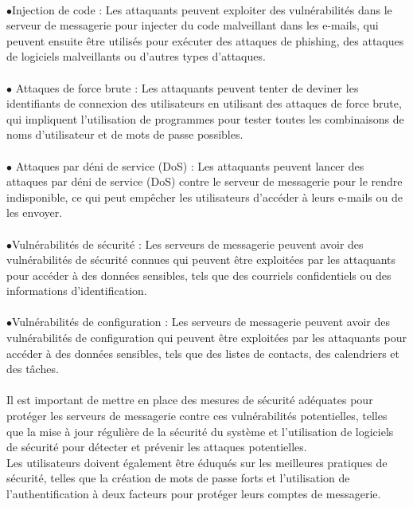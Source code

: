 \paragraph{ }
$\bullet$Injection de code : Les attaquants peuvent exploiter des vulnérabilités dans le serveur de messagerie pour injecter du code malveillant dans les e-mails, qui peuvent ensuite être utilisés pour exécuter des attaques de phishing, des attaques de logiciels malveillants ou d'autres types d'attaques.

\paragraph{ }
$\bullet$ Attaques de force brute : Les attaquants peuvent tenter de deviner les identifiants de connexion des utilisateurs en utilisant des attaques de force brute, qui impliquent l'utilisation de programmes pour tester toutes les combinaisons de noms d'utilisateur et de mots de passe possibles.

\paragraph{ }
$\bullet$ Attaques par déni de service (DoS) : Les attaquants peuvent lancer des attaques par déni de service (DoS) contre le serveur de messagerie pour le rendre indisponible, ce qui peut empêcher les utilisateurs d'accéder à leurs e-mails ou de les envoyer.

\paragraph{ }
$\bullet$Vulnérabilités de sécurité : Les serveurs de messagerie peuvent avoir des vulnérabilités de sécurité connues qui peuvent être exploitées par les attaquants pour accéder à des données sensibles, tels que des courriels confidentiels ou des informations d'identification.

\paragraph{ }
$\bullet$Vulnérabilités de configuration : Les serveurs de messagerie peuvent avoir des vulnérabilités de configuration qui peuvent être exploitées par les attaquants pour accéder à des données sensibles, tels que des listes de contacts, des calendriers et des tâches.
\paragraph{ }
Il est important de mettre en place des mesures de sécurité adéquates pour protéger les serveurs de messagerie contre ces vulnérabilités potentielles, telles que la mise à jour régulière de la sécurité du système et l'utilisation de logiciels de sécurité pour détecter et prévenir les attaques potentielles.\\
 Les utilisateurs doivent également être éduqués sur les meilleures pratiques de sécurité, telles que la création de mots de passe forts et l'utilisation de l'authentification à deux facteurs pour protéger leurs comptes de messagerie.\\
